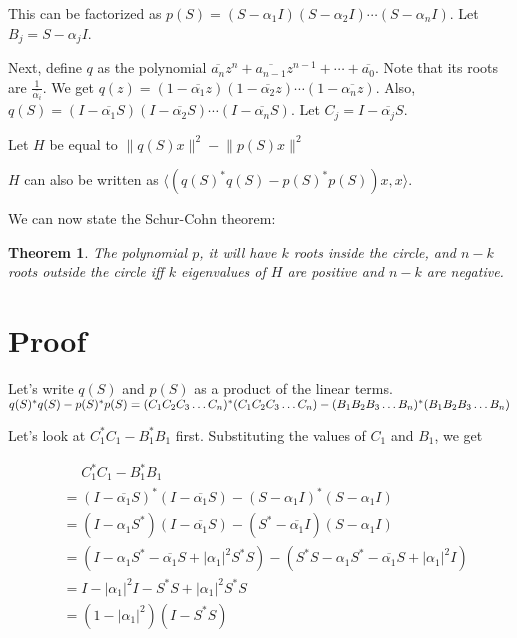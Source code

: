 \documentclass[twofold]{article}
\newcommand*\conj[1]{\overline{#1}}
\newcommand*\adj[1]{#1^*}
\newcommand*\abs[1]{\left \vert #1 \right\vert}
\theoremstyle{plain}
\newtheorem*{theorem}{Theorem}
\theoremstyle{definition}
\begin{document}
This can be factorized as \(p(S) = (S - \alpha_1I) (S - \alpha_2 I) \cdots (S - \alpha_n I)\). Let \(B_j = S - \alpha_jI\).

Next, define \(q\) as the polynomial \(\conj{a_n}z^n + \conj{a_{n-1}}z^{n-1} + \cdots + \conj{a_0}\). Note that its roots are \(\frac {1}{\conj{\alpha_i}}\). We get \(q(z) = (1 - \conj{\alpha_1}z) (1 - \conj{\alpha_2}z) \cdots (1 - \conj{\alpha_nz})\). Also, \(q(S) = (I - \conj{\alpha_1}S) (I - \conj{\alpha_2}S) \cdots (I - \conj{\alpha_n}S)\). Let \(C_j= I -  \conj{\alpha_j} S\).


Let \(H\) be equal to \(\lVert q(S) x \rVert^2 - \lVert p(S) x \rVert^2\)

\(H\) can also be written as \(\langle (\adj{q(S)} q(S) - \adj{p(S)} p(S))x, x\rangle\).

We can now state the Schur-Cohn theorem:

\begin{theorem}The polynomial \(p\), it will have \(k\) roots inside the circle, and \(n-k\) roots outside the circle iff \(k\) eigenvalues of \(H\) are positive and \(n-k\) are negative. \end{theorem}

\section{Proof}

Let's write \(q(S)\) and \(p(S)\) as a product of the linear terms. \(\adj{q(S)} q(S) - \adj{p(S)} p(S) \\= \adj{(C_1C_2C_3 \ldots C_n)}(C_1C_2C_3\ldots C_n) - \adj{(B_1B_2B_3\ldots B_n)} (B_1B_2B_3\ldots B_n)\)

Let's look at \(\adj{C_1} C_1 - \adj{B_1} B_1\) first. Substituting the values of \(C_1\) and \(B_1\), we get 

\begin{equation*}
\begin{split}
& \phantom{=}    \adj{C_1}C_1 - \adj{B_1} B_1 \\
 & = \adj{(I - \conj{\alpha_1}S)} (I - \conj{\alpha_1}S) - \adj{(S - \alpha_1 I)} (S - \alpha_1 I) \\
& = (I - \alpha_1\adj{S}) (I - \conj{\alpha_1}S) - (\adj{S} - \conj{\alpha_1} I) (S - \alpha_1 I) \\
 & = (I - \alpha_1\adj{S} - \conj{\alpha_1}S + \abs{\alpha_1}^2 \adj{S} S) - (\adj{S} S - \alpha_1 \adj{S} - \conj{\alpha_1} S + \abs{\alpha_1}^2I)\\
& = I - \abs{\alpha_1}^2 I - \adj{S} S + \abs{\alpha_1}^2 \adj{S} S \\
& = (1 - \abs{\alpha_1}^2) (I - \adj{S} S)
\end{split}
\end{equation*}
\end{document}
